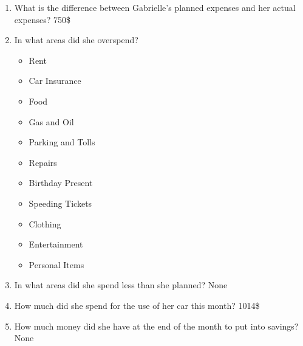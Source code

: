 \documentclass[11pt]{article}
\begin{document}
\begin{enumerate}
\item What is the difference between Gabrielle's planned expenses and her actual expenses?
750\$
\item In what areas did she overspend?
\begin{itemize}
\item Rent
\item Car Insurance
\item Food
\item Gas and Oil
\item Parking and Tolls
\item Repairs
\item Birthday Present
\item Speeding Tickets
\item Clothing
\item Entertainment
\item Personal Items
\end{itemize}
\item In what areas did she spend less than she planned?
None
\item How much did she spend for the use of her car this month?
1014\$
\item How much money did she have at the end of the month to put into savings?
None
\end{enumerate}
\end{document}
